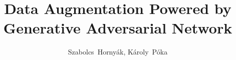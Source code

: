 \documentclass[10pt,journal,compsoc]{IEEEtran}
\begin{document}
%
\title{Data Augmentation Powered by \\ Generative Adversarial Network}
%
%
%
%

\author{Szabolcs~Hornyák, Károly~Póka}

% 
%
\end{document}
